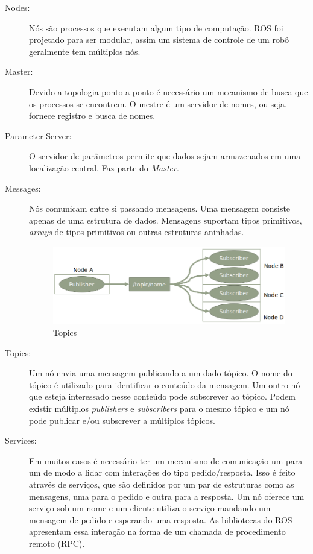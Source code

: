 \begin{description}
\item[Nodes:] Nós são processos que executam algum tipo de computação. ROS foi projetado para ser modular, assim um sistema de controle de um robô geralmente tem múltiplos nós. 

\item[Master:] Devido a topologia ponto-a-ponto é necessário um mecanismo de busca que os processos se encontrem. O mestre é um servidor de nomes, ou seja, fornece registro e busca de nomes.

\item[Parameter Server:] O servidor de parâmetros permite que dados sejam armazenados em uma localização central. Faz parte do \textit{Master}.

\item[Messages:] Nós comunicam entre si passando mensagens. Uma mensagem consiste apenas de uma estrutura de dados. Mensagens suportam tipos primitivos, \textit{arrays} de tipos primitivos ou outras estruturas aninhadas. 

\begin{figure}[!h]
  \centering
  \includegraphics[width=0.9\linewidth]{./img/topics.png}
  \caption{Topics}
  \label{fig:topics}
\end{figure}

\item[Topics:] Um nó envia uma mensagem publicando a um dado tópico. O nome do tópico é utilizado para identificar o conteúdo da mensagem. Um outro nó que esteja interessado nesse conteúdo pode subscrever ao tópico. Podem existir múltiplos \textit{publishers} e \textit{subscribers} para o mesmo tópico e um nó pode publicar e/ou subscrever a múltiplos tópicos. 

\item[Services:] Em muitos casos é necessário ter um mecanismo de comunicação um para um de modo a lidar com interações do tipo pedido/resposta. Isso é feito através de serviços, que são definidos por um par de estruturas como as mensagens, uma para o pedido e outra para a resposta. Um nó oferece um serviço sob um nome e um cliente utiliza o serviço mandando um mensagem de pedido e esperando uma resposta. As bibliotecas do ROS apresentam essa interação na forma de um chamada de procedimento remoto (RPC).


\end{description}
